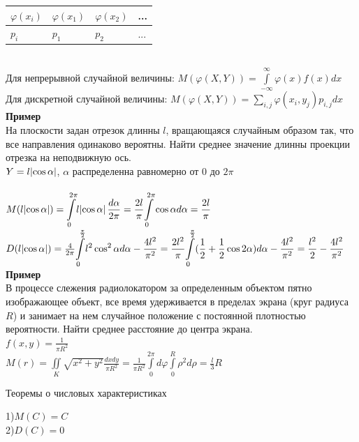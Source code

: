 \documentclass[russian, 12pt, fleqn]{article}
\begin{document}
\begin{tabular}[b]{ | l | l |  l | l | }
\hline
$\varphi(x_i)$&$\varphi(x_1)$&$\varphi(x_2)$&...\\
\hline
$p_i$&$p_1$&$p_2$&...\\
\hline
\end{tabular}\\
Для непрерывной  случайной величины: $M(\varphi(X, Y)) = \displaystyle{\int \limits _{-\infty}^{\infty} } \varphi(x) f(x) dx$\\
Для дискретной случайной  величины: $M(\varphi(X, Y)) = \displaystyle{\sum \limits _{i,j}^{} } \varphi(x_i, y_j) p_{i, j}  dx$\\
\textbf{Пример} \\
На плоскости задан отрезок длинны $l$, вращающаяся случайным образом так, что все направления одинаково вероятны. Найти среднее значение длинны проекции отрезка на неподвижную ось.\\
$Y = l \abs{\cos \alpha}$, $\alpha$ распределенна равномерно от 0 до $2\pi$\\
\\
$M(l\abs{\cos \alpha}) = \displaystyle{\int \limits_{0}^{2\pi}} l\abs{\cos \alpha} \frac{d\alpha}{2\pi}=\frac{2l}{\pi} \displaystyle{\int \limits_{0}^{2\pi}} \cos \alpha  d\alpha = \frac{2l}{\pi}$\\
$D(l\abs{\cos \alpha}) = \frac{4}{2\pi}  \displaystyle{\int \limits_{0}^{\frac{\pi}{2}}} l^2\cos^2 \alpha d\alpha  - \frac {4l^2}{\pi^2}= \frac{2l^2}{\pi} \displaystyle{\int \limits_{0}^{\frac{\pi}{2}}} (\frac{1}{2} + \frac{1}{2} \cos 2\alpha) d\alpha - \frac{4l^2}{\pi^2} = \frac{l^2}{2} - \frac{4l^2}{\pi^2}$\\
\textbf{Пример}\\ В процессе слежения радиолокатором за определенным объектом пятно изображающее объект, все время удерживается в пределах экрана (круг радиуса $R$)  и занимает на нем случайное положение с постоянной плотностью вероятности. Найти среднее расстояние до центра экрана.\\
$f(x, y) = \frac{1}{\pi R^2}$\\
$M(r) = \displaystyle{\iint\limits_{K}} \sqrt{x^2+y^2}\frac{dxdy}{\pi R^2} = \frac{1}{\pi R^2} \displaystyle{\int\limits_{0}^{2\pi}} d \varphi \displaystyle{\int\limits_{0}^{R}} \rho^2 d \rho = \frac{l}{3} R$
\begin{center}
$\textbf{Теоремы о числовых характеристиках}$
\end{center}
1)$M(C) = C$\\
2)$D(C) = 0$\\
\end{document}
